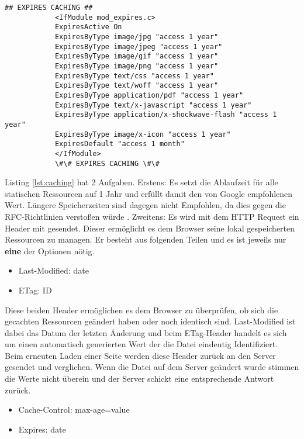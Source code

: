 		  \begin{lstlisting}[captionpos=b, caption=Aktivieren von Browser Caching in Apache (Listing nach: \autocite{sextonCaching}), label=lst:caching]
		  	## EXPIRES CACHING ##
		  	<IfModule mod_expires.c>
		  	ExpiresActive On
		  	ExpiresByType image/jpg "access 1 year"
		  	ExpiresByType image/jpeg "access 1 year"
		  	ExpiresByType image/gif "access 1 year"
		  	ExpiresByType image/png "access 1 year"
		  	ExpiresByType text/css "access 1 year"
		  	ExpiresByType text/woff "access 1 year"
		  	ExpiresByType application/pdf "access 1 year"
		  	ExpiresByType text/x-javascript "access 1 year"
		  	ExpiresByType application/x-shockwave-flash "access 1 year"
		  	ExpiresByType image/x-icon "access 1 year"
		  	ExpiresDefault "access 1 month"
		  	</IfModule>
		  	\#\# EXPIRES CACHING \#\#
		  \end{lstlisting}

		  Listing \ref{lst:caching} hat 2 Aufgaben. Erstens: Es setzt die Ablaufzeit für alle statischen Ressourcen auf 1 Jahr und erfüllt damit den von Google empfohlenen Wert. Längere Speicherzeiten sind dagegen nicht Empfohlen, da dies gegen die RFC-Richtlinien verstoßen würde \autocite{google14Caching}. Zweitens: Es wird mit dem HTTP Request ein Header mit gesendet. Dieser ermöglicht es dem Browser seine lokal gespeicherten Ressourcen zu managen. Er besteht aus folgenden Teilen und es ist jeweils nur \textbf{eine} der Optionen nötig.

		  \begin{itemize}
		  	\item Last-Modified: date
		  	\item ETag: ID
		  \end{itemize}

		  Diese beiden Header ermöglichen es dem Browser zu überprüfen, ob sich die gecachten Ressourcen geändert haben oder noch identisch sind. Last-Modified ist dabei das Datum der letzten Änderung und beim ETag-Header handelt es sich um einen automatisch generierten Wert der die Datei eindeutig Identifiziert.\\
		  Beim erneuten Laden einer Seite werden diese Header zurück an den Server gesendet und verglichen. Wenn die Datei auf dem Server geändert wurde stimmen die Werte nicht überein und der Server schickt eine entsprechende Antwort zurück.

		  \begin{itemize}
		  	\item Cache-Control: max-age=value
		  	\item Expires: date
		  \end{itemize}

